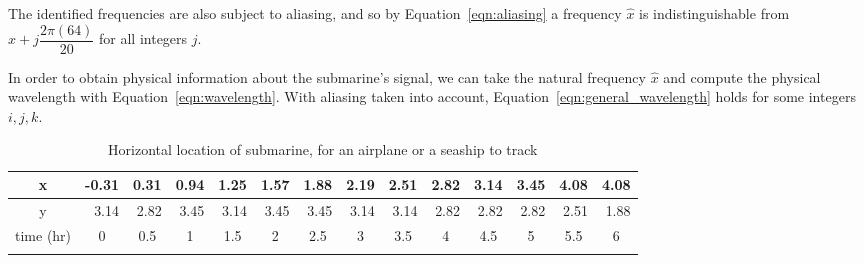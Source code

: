 \documentclass{article}
\begin{document}
The identified frequencies are also subject to aliasing, and so by Equation~\ref{eqn:aliasing} a frequency $\hat{x}$ is indistinguishable from $\hat{x}+j\dfrac{2\pi(64)}{20}$ for all integers $j$.



In order to obtain physical information about the submarine's signal, we can take the natural frequency $\hat{x}$ and compute the physical wavelength with Equation~\ref{eqn:wavelength}. With aliasing taken into account, Equation~\ref{eqn:general_wavelength} holds for some integers $i,j,k$.


\begin{table}[!b]
	\caption{Horizontal location of submarine, for an airplane or a seaship to track}
	\begin{tabular}{crrrrrrrrrrrrl}
		\hline
		\multicolumn{1}{|c|}{x}         & \multicolumn{1}{r|}{-0.31} & \multicolumn{1}{r|}{0.31}  & \multicolumn{1}{r|}{0.94}  & \multicolumn{1}{r|}{1.25}  & \multicolumn{1}{r|}{1.57}  & \multicolumn{1}{r|}{1.88}  & \multicolumn{1}{r|}{2.19}  & \multicolumn{1}{r|}{2.51}  & \multicolumn{1}{r|}{2.82}  & \multicolumn{1}{r|}{3.14}  & \multicolumn{1}{r|}{3.45}  & \multicolumn{1}{r|}{4.08}  & \multicolumn{1}{r|}{4.08} \\ \hline
		\multicolumn{1}{|c|}{y}         & \multicolumn{1}{r|}{3.14}  & \multicolumn{1}{r|}{2.82}  & \multicolumn{1}{r|}{3.45}  & \multicolumn{1}{r|}{3.14}  & \multicolumn{1}{r|}{3.45}  & \multicolumn{1}{r|}{3.45}  & \multicolumn{1}{r|}{3.14}  & \multicolumn{1}{r|}{3.14}  & \multicolumn{1}{r|}{2.82}  & \multicolumn{1}{r|}{2.82}  & \multicolumn{1}{r|}{2.82}  & \multicolumn{1}{r|}{2.51}  & \multicolumn{1}{r|}{1.88} \\ \hline
		\multicolumn{1}{|c|}{time (hr)} & \multicolumn{1}{c|}{0}     & \multicolumn{1}{c|}{0.5}   & \multicolumn{1}{c|}{1}     & \multicolumn{1}{c|}{1.5}   & \multicolumn{1}{c|}{2}     & \multicolumn{1}{c|}{2.5}   & \multicolumn{1}{c|}{3}     & \multicolumn{1}{c|}{3.5}   & \multicolumn{1}{c|}{4}     & \multicolumn{1}{c|}{4.5}   & \multicolumn{1}{c|}{5}     & \multicolumn{1}{c|}{5.5}   & \multicolumn{1}{c|}{6}    \\ \hline
		\multicolumn{1}{l}{}            & \multicolumn{1}{l}{}       & \multicolumn{1}{l}{}       & \multicolumn{1}{l}{}       & \multicolumn{1}{l}{}       & \multicolumn{1}{l}{}       & \multicolumn{1}{l}{}       & \multicolumn{1}{l}{}       & \multicolumn{1}{l}{}       & \multicolumn{1}{l}{}       & \multicolumn{1}{l}{}       & \multicolumn{1}{l}{}       & \multicolumn{1}{l}{}       &                           \\ \cline{1-13}

\end{tabular}
\end{table}
\end{document}

